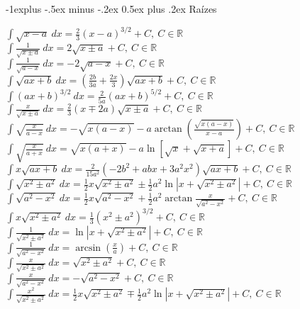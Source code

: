 \documentclass[10pt,landscape]{article}
\makeatletter
\renewcommand{\subsection}{\@startsection{subsection}{2}{0mm}%
                                {-1explus -.5ex minus -.2ex}%
                                {0.5ex plus .2ex}%
                                {\normalfont\normalsize\bfseries}}
\makeatother
\begin{document}
\begin{multicols}{3}
\subsection{Raízes}

$\int \sqrt{x-a}\ dx = \frac{2}{3}(x-a)^{3/2} + C,\ C \in \mathbb{R}$\\
$\int \frac{1}{\sqrt{x\pm a}}\ dx = 2\sqrt{x\pm a} + C,\ C \in \mathbb{R}$\\
$\int \frac{1}{\sqrt{a-x}}\ dx = -2\sqrt{a-x} + C,\ C \in \mathbb{R}$\\
$\int \sqrt{ax+b}\ dx = \left(\frac{2b}{3a}+\frac{2x}{3}\right)\sqrt{ax+b} + C,\ C \in \mathbb{R}$\\
$\int (ax+b)^{3/2}\ dx =\frac{2}{5a}(ax+b)^{5/2} + C,\ C \in \mathbb{R}$\\
$\int \frac{x}{\sqrt{x\pm a} } \ dx = \frac{2}{3}(x\mp 2a)\sqrt{x\pm a} + C,\ C \in \mathbb{R}$\\
$\int \sqrt{\frac{x}{a-x}}\ dx =  -\sqrt{x(a-x)}-a\arctan(\frac{\sqrt{x(a-x)}}{x-a}) + C,\ C \in \mathbb{R}$\\
$\int \sqrt{\frac{x}{a+x}}\ dx =  \sqrt{x(a+x)}-a\ln \left [ \sqrt{x} + \sqrt{x+a}\right] + C,\ C \in \mathbb{R}$\\
$\int x \sqrt{ax + b}\ dx =\frac{2}{15 a^2}(-2b^2+abx + 3 a^2 x^2)\sqrt{ax+b} + C,\ C \in \mathbb{R}$\\
$\int\sqrt{x^2 \pm a^2}\ dx = \frac{1}{2}x\sqrt{x^2\pm a^2}\pm\frac{1}{2}a^2 \ln \left | x + \sqrt{x^2\pm a^2} \right | + C,\ C \in \mathbb{R}$\\ 
$\int  \sqrt{a^2 - x^2}\ dx = \frac{1}{2} x \sqrt{a^2-x^2}+\frac{1}{2}a^2\arctan\frac{x}{\sqrt{a^2-x^2}} + C,\ C \in \mathbb{R}$\\
$\int  x \sqrt{x^2 \pm a^2}\ dx= \frac{1}{3}\left ( x^2 \pm a^2 \right)^{3/2} + C,\ C \in \mathbb{R}$\\
$\int \frac{1}{\sqrt{x^2 \pm a^2}}\ dx = \ln \left | x + \sqrt{x^2 \pm a^2} \right | + C,\ C \in \mathbb{R}$\\
$\int \frac{1}{\sqrt{a^2 - x^2}}\ dx = \arcsin(\frac{x}{a}) + C,\ C \in \mathbb{R}$\\
$\int \frac{x}{\sqrt{x^2\pm a^2}}\ dx = \sqrt{x^2 \pm a^2} + C,\ C \in \mathbb{R}$\\
$\int \frac{x}{\sqrt{a^2-x^2}}\ dx = -\sqrt{a^2-x^2} + C,\ C \in \mathbb{R}$\\
$\int \frac{x^2}{\sqrt{x^2 \pm a^2}}\ dx = \frac{1}{2}x\sqrt{x^2 \pm a^2} \mp \frac{1}{2}a^2 \ln \left| x + \sqrt{x^2\pm a^2} \right |  + C,\ C \in \mathbb{R}$\\

\end{multicols}
\end{document}
